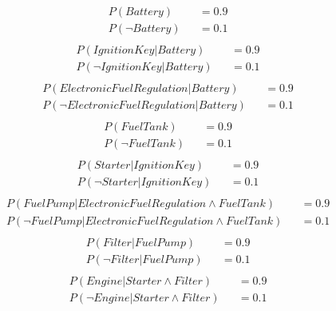 \documentclass[ngerman]{fbi-aufgabenblatt}
\begin{document}
\begin{align*}
&P(Battery) &&= 0.9\\
&P(\neg Battery) &&= 0.1\\
\end{align*}
\begin{align*}
&P(Ignition Key|Battery) &&= 0.9\\
&P(\neg Ignition Key| Battery) &&= 0.1\\
\end{align*}
\begin{align*}
&P(Electronic Fuel Regulation|Battery) &&= 0.9\\
&P(\neg Electronic Fuel Regulation| Battery) &&= 0.1\\
\end{align*}
\begin{align*}
&P(Fuel Tank) &&= 0.9\\
&P(\neg Fuel Tank) &&= 0.1\\
\end{align*}
\begin{align*}
&P(Starter| Ignition Key) &&= 0.9\\
&P(\neg Starter | Ignition Key) &&= 0.1\\
\end{align*}
\begin{align*}
&P(Fuel Pump | Electronic Fuel Regulation \land Fuel Tank) &&= 0.9\\
&P(\neg Fuel Pump | Electronic Fuel Regulation \land Fuel Tank) &&= 0.1\\
\end{align*}
\begin{align*}
&P(Filter | Fuel Pump) &&= 0.9\\
&P(\neg Filter | Fuel Pump) &&= 0.1\\
\end{align*}
\begin{align*}
&P(Engine | Starter \land Filter) &&= 0.9\\
&P(\neg Engine | Starter \land Filter) &&= 0.1\\
\end{align*}
\end{document}
